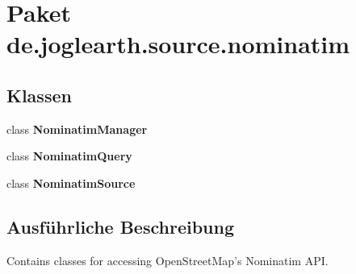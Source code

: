 \section{Paket de.\-joglearth.\-source.\-nominatim}
\label{namespacede_1_1joglearth_1_1source_1_1nominatim}
\subsection*{Klassen}
\begin{DoxyCompactItemize}
\item 
class {\bf Nominatim\-Manager}
\item 
class {\bf Nominatim\-Query}
\item 
class {\bf Nominatim\-Source}
\end{DoxyCompactItemize}


\subsection{Ausführliche Beschreibung}
Contains classes for accessing Open\-Street\-Map's Nominatim A\-P\-I. 